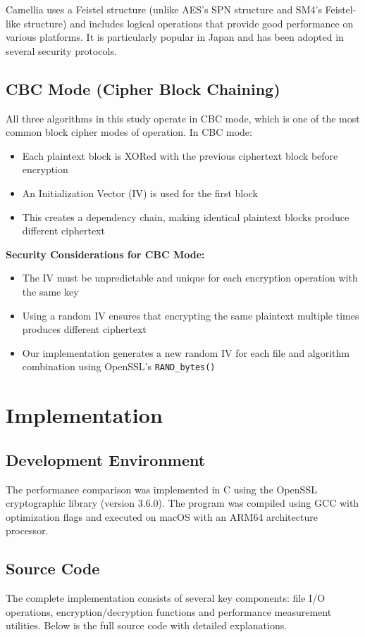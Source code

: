 \documentclass[12pt,a4paper]{article}
\begin{document}
Camellia uses a Feistel structure (unlike AES's SPN structure and SM4's Feistel-like structure) and includes logical operations that provide good performance on various platforms. It is particularly popular in Japan and has been adopted in several security protocols.

\subsection{CBC Mode (Cipher Block Chaining)}
All three algorithms in this study operate in CBC mode, which is one of the most common block cipher modes of operation. In CBC mode:
\begin{itemize}
    \item Each plaintext block is XORed with the previous ciphertext block before encryption
    \item An Initialization Vector (IV) is used for the first block
    \item This creates a dependency chain, making identical plaintext blocks produce different ciphertext
\end{itemize}

\textbf{Security Considerations for CBC Mode:}
\begin{itemize}
    \item The IV must be unpredictable and unique for each encryption operation with the same key
    \item Using a random IV ensures that encrypting the same plaintext multiple times produces different ciphertext
    \item Our implementation generates a new random IV for each file and algorithm combination using OpenSSL's \texttt{RAND\_bytes()}
\end{itemize}

\newpage

\section{Implementation}

\subsection{Development Environment}
The performance comparison was implemented in C using the OpenSSL cryptographic library (version 3.6.0). The program was compiled using GCC with optimization flags and executed on macOS with an ARM64 architecture processor.

\subsection{Source Code}
The complete implementation consists of several key components: file I/O operations, encryption/decryption functions and performance measurement utilities. Below is the full source code with detailed explanations.
\end{document}
